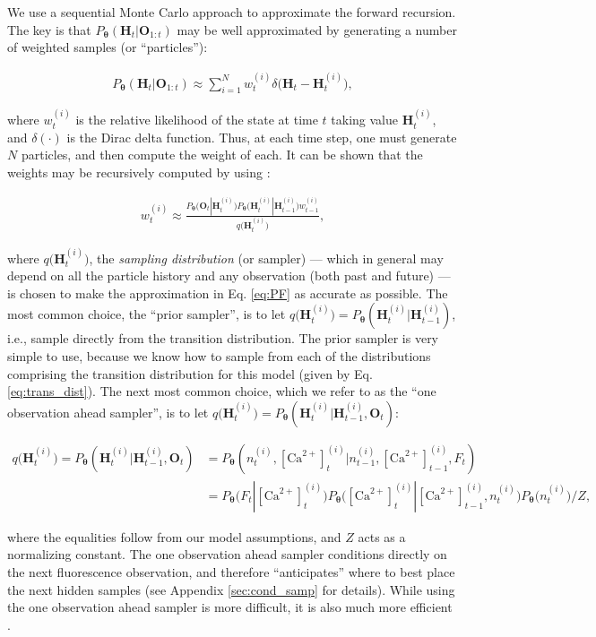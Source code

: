 \documentclass[12pt]{article}
\providecommand{\ve}[1]{\boldsymbol{#1}}
\providecommand{\ve}[1]{\boldsymbol{#1}}
\newcommand{\thetn}{\ve{\theta}}
\newcommand{\p}{P_{\thetn}}
\newcommand{\q}{q\big(\ve{H}_t^{(i)}\big)}
\newcommand{\Ca}{[\text{Ca}^{2+}]}
\begin{document}
We use a sequential Monte Carlo approach to approximate the forward recursion.  The key is that $\p(\ve{H}_t | \ve{O}_{1:t})$ may be well approximated by generating a number of weighted samples (or ``particles''):

\begin{align} \label{eq:PF}
\p(\ve{H}_t |  \ve{O}_{1:t}) \approx \sum_{i=1}^N w_t^{(i)} \delta \big( \ve{H}_t - \ve{H}_t^{(i)}\big),
\end{align}

\noindent where $w_t^{(i)}$ is the relative likelihood of the state at time $t$ taking value $\ve{H}_t^{(i)}$, and $\delta(\cdot)$ is the Dirac delta function. Thus, at each time step, one must generate $N$ particles, and then compute the weight of each. It can be shown that the weights may be recursively computed by using \cite{DoucetGordon01}:

\begin{align} \label{eq:WEIGHT}
w_t^{(i)} \approx  \frac{\p\big(\ve{O}_t | \ve{H}_t^{(i)}\big) \p\big(\ve{H}_t^{(i)} | \ve{H}_{t-1}^{(i)}\big) w_{t-1}^{(i)}}{\q},
\end{align}

\noindent where $\q$, the \emph{sampling distribution} (or sampler) --- which in general may depend on all the particle history and any observation (both past and future) --- is chosen to make the approximation in Eq. \ref{eq:PF} as accurate as possible. The most common choice, the ``prior sampler'',  is to let $\q=\p(\ve{H}_t^{(i)} | \ve{H}_{t-1}^{(i)})$, i.e., sample directly from the transition distribution. The prior sampler is very simple to use, because we know how to sample from each of the distributions comprising the transition distribution for this model  (given by Eq. \ref{eq:trans_dist}). The next most common choice, which we refer to as the ``one observation ahead sampler''\cite{DoucetGordon01},  is to let $\q=\p(\ve{H}_t^{(i)} | \ve{H}_{t-1}^{(i)}, \ve{O}_t)$:

\begin{align} \label{eq:SAMP}
\q=\p(\ve{H}_t^{(i)} | \ve{H}_{t-1}^{(i)}, \ve{O}_t) &=
 \p (n_t^{(i)},\Ca_t^{(i)} | n_{t-1}^{(i)}, \Ca_{t-1}^{(i)}, F_t)
\nonumber \\ &= \p \big( F_t | \Ca_t^{(i)} \big) \p \big( \Ca_t^{(i)}   | \Ca^{(i)}_{t-1}, n_t^{(i)} \big)  \p \big( n_t^{(i)} \big)/Z, 
\end{align}

\noindent where the equalities follow from our model assumptions, and $Z$ acts as a normalizing constant. The one observation ahead sampler conditions directly on the next fluorescence observation, and therefore ``anticipates'' where to best place the next hidden samples (see Appendix \ref{sec:cond_samp} for details). While using the one observation ahead sampler is more difficult, it is also much more efficient \cite{DoucetGordon01}. 
\end{document}
